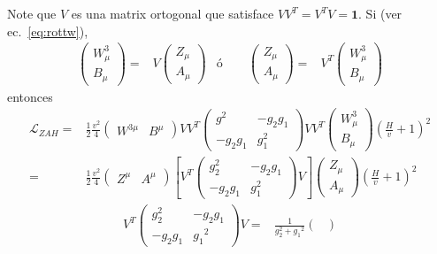 \begin{frame}
Note que $V$ es una matrix ortogonal que satisface $VV^T=V^TV=\mathbf{1}$. Si (ver ec.~\eqref{eq:rottw}),
\begin{align}
  \begin{pmatrix}
    W^3_\mu\\
    B_\mu
  \end{pmatrix}=&V
  \begin{pmatrix}
    Z_\mu\\
    A_\mu
  \end{pmatrix}&\text{ó}\qquad
  \begin{pmatrix}
    Z_\mu\\
    A_\mu
  \end{pmatrix}=&V^T
  \begin{pmatrix}
    W^3_\mu\\
    B_\mu
  \end{pmatrix}
\end{align}
entonces
\begin{align}
  \mathcal{L}_{ZAH}=&\frac{1}{2}\frac{v^2}{4}
  \begin{pmatrix}
    W^{3\mu} & B^\mu
  \end{pmatrix}VV^T
  \begin{pmatrix}
    g^2&-g_2{g_1}\\
    -g_2{g_1}&g_1^2
  \end{pmatrix}VV^T
  \begin{pmatrix}
    W^3_\mu\\
    B_\mu
  \end{pmatrix}
\left(\frac{H}{v}+1\right)^2\nonumber\\
=&\frac{1}{2}\frac{v^2}{4}
  \begin{pmatrix}
    Z^\mu & A^\mu
  \end{pmatrix}\left[V^T
  \begin{pmatrix}
    g_2^2&-g_2{g_1}\\
    -g_2{g_1}&g_1^2
  \end{pmatrix}V\right]
  \begin{pmatrix}
    Z_\mu\\
    A_\mu
  \end{pmatrix}
\left(\frac{H}{v}+1\right)^2
\end{align}
\begin{align}
  V^T
  \begin{pmatrix}
    g_2^2&-g_2{g_1}\\
    -g_2{g_1}&{{g_1}}^2
  \end{pmatrix}V=&\frac{1}{g_2^2+{{g_1}}^2}
  \begin{pmatrix}

\end{pmatrix}
\end{align}
\end{frame}
